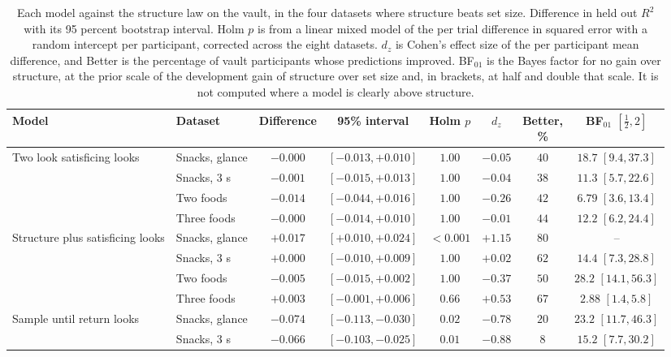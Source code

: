 \begin{table}[t]
\centering
\footnotesize
\setlength{\tabcolsep}{4pt}
\caption{Each model against the structure law on the vault, in the four datasets where structure beats set size. Difference in held out $R^2$ with its 95 percent bootstrap interval. Holm $p$ is from a linear mixed model of the per trial difference in squared error with a random intercept per participant, corrected across the eight datasets. $d_z$ is Cohen's effect size of the per participant mean difference, and Better is the percentage of vault participants whose predictions improved. BF$_{01}$ is the Bayes factor for no gain over structure, at the prior scale of the development gain of structure over set size and, in brackets, at half and double that scale. It is not computed where a model is clearly above structure.}
\label{tab:contrasts}
\begin{tabular}{>{\raggedright\arraybackslash}p{3.0cm}lcccccc}
\toprule
Model & Dataset & Difference & 95\% interval & Holm $p$ & $d_z$ & \makecell{Better,\\\%} & \makecell{BF$_{01}$\\$[\tfrac12, 2]$} \\
\midrule
Two look satisficing looks & Snacks, glance & $-0.000$ & $[-0.013, +0.010]$ & $1.00$ & $-0.05$ & $40$ & $18.7$ $[9.4, 37.3]$ \\
 & Snacks, 3 s & $-0.001$ & $[-0.015, +0.013]$ & $1.00$ & $-0.04$ & $38$ & $11.3$ $[5.7, 22.6]$ \\
 & Two foods & $-0.014$ & $[-0.044, +0.016]$ & $1.00$ & $-0.26$ & $42$ & $6.79$ $[3.6, 13.4]$ \\
 & Three foods & $-0.000$ & $[-0.014, +0.010]$ & $1.00$ & $-0.01$ & $44$ & $12.2$ $[6.2, 24.4]$ \\
\addlinespace
Structure plus satisficing looks & Snacks, glance & $+0.017$ & $[+0.010, +0.024]$ & $<0.001$ & $+1.15$ & $80$ & -- \\
 & Snacks, 3 s & $+0.000$ & $[-0.010, +0.009]$ & $1.00$ & $+0.02$ & $62$ & $14.4$ $[7.3, 28.8]$ \\
 & Two foods & $-0.005$ & $[-0.015, +0.002]$ & $1.00$ & $-0.37$ & $50$ & $28.2$ $[14.1, 56.3]$ \\
 & Three foods & $+0.003$ & $[-0.001, +0.006]$ & $0.66$ & $+0.53$ & $67$ & $2.88$ $[1.4, 5.8]$ \\
\addlinespace
Sample until return looks & Snacks, glance & $-0.074$ & $[-0.113, -0.030]$ & $0.02$ & $-0.78$ & $20$ & $23.2$ $[11.7, 46.3]$ \\
 & Snacks, 3 s & $-0.066$ & $[-0.103, -0.025]$ & $0.01$ & $-0.88$ & $8$ & $15.2$ $[7.7, 30.2]$ \\

\end{tabular}
\end{table}
